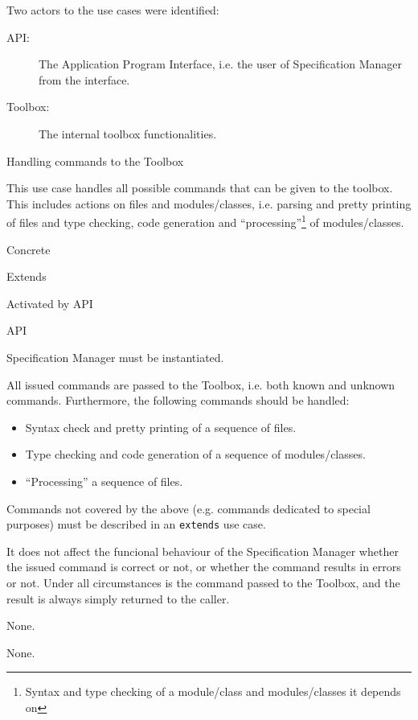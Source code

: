 \documentclass[11pt]{article}
\newcommand{\specman} {Specification Manager}
\begin{document}
Two actors to the use cases were identified:
\begin{description}
\item[API:] The Application Program Interface, i.e. the user of
  \specman{} from the interface. 
\item[Toolbox:] The internal toolbox functionalities.
\end{description}


  \begin{description}
  {\large \item[Use Case no. 1:] Handling commands to the Toolbox}
\item[Introduction] \hfill\par This use case handles all possible
  commands that can be given to the toolbox. This includes actions on
  files and modules/classes, i.e. parsing and pretty printing of files
  and type checking, code generation and
  ``processing''\footnote{Syntax and type checking of a module/class and
    modules/classes it depends on} of modules/classes.
  \item[Type] Concrete
  \item[Relations] Extends
  \item[Initialisation] \hfill\par Activated by API
  \item[Actors] \hfill\par API
  \item[Preconditions] \hfill\par \specman{} must be instantiated. 
  \item[Description] \hfill\par All issued commands are passed to the
    Toolbox, i.e. both known and unknown commands.
    Furthermore, the following commands should be handled:
    \begin{itemize}
    \item Syntax check and pretty printing of a sequence of files.
    \item Type checking and code generation of a sequence of
      modules/classes.
    \item ``Processing'' a sequence of files. 
    \end{itemize}
    
    Commands not covered by the above (e.g. commands dedicated to
    special purposes) must be described in an \texttt{extends} use
    case. 

    It does not affect the funcional behaviour of the \specman{}
    whether the issued command is correct or not, or whether the
    command results in errors or not. Under all circumstances is the
    command passed to the Toolbox, and the result is always
    simply returned to the caller.
  \item[Exeptions] \hfill\par
    None.
  \item[Postconditions] \hfill\par None.
  \end{description}
\end{document}
